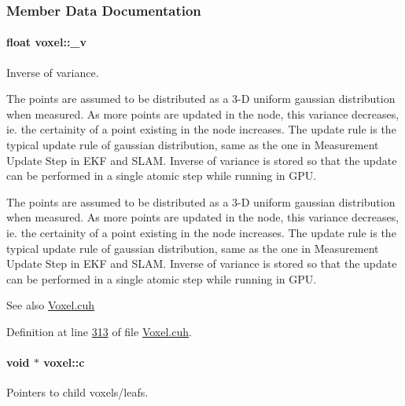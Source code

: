 \subsubsection{Member Data Documentation}
\paragraph[{\texorpdfstring{\+\_\+v}{_v}}]{\setlength{\rightskip}{0pt plus 5cm}float voxel\+::\+\_\+v}\hypertarget{classvoxel_a01aebb82be393552c039c11a2c168845}{}\label{classvoxel_a01aebb82be393552c039c11a2c168845}


Inverse of variance. 

The points are assumed to be distributed as a 3-\/D uniform gaussian distribution when measured. As more points are updated in the node, this variance decreases, ie. the certainity of a point existing in the node increases. The update rule is the typical update rule of gaussian distribution, same as the one in Measurement Update Step in E\+KF and S\+L\+AM. Inverse of variance is stored so that the update can be performed in a single atomic step while running in G\+PU.

The points are assumed to be distributed as a 3-\/D uniform gaussian distribution when measured. As more points are updated in the node, this variance decreases, ie. the certainity of a point existing in the node increases. The update rule is the typical update rule of gaussian distribution, same as the one in Measurement Update Step in E\+KF and S\+L\+AM. Inverse of variance is stored so that the update can be performed in a single atomic step while running in G\+PU. \begin{DoxySeeAlso}{See also}
\hyperlink{Voxel_8cuh}{Voxel.\+cuh} 
\end{DoxySeeAlso}


Definition at line \hyperlink{Voxel_8cuh_source_l00313}{313} of file \hyperlink{Voxel_8cuh_source}{Voxel.\+cuh}.

\paragraph[{\texorpdfstring{c}{c}}]{\setlength{\rightskip}{0pt plus 5cm}void $\ast$ voxel\+::c}\hypertarget{classvoxel_aa280f71c0258d85ffef6f1818872a00a}{}\label{classvoxel_aa280f71c0258d85ffef6f1818872a00a}


Pointers to child voxels/leafs. 

